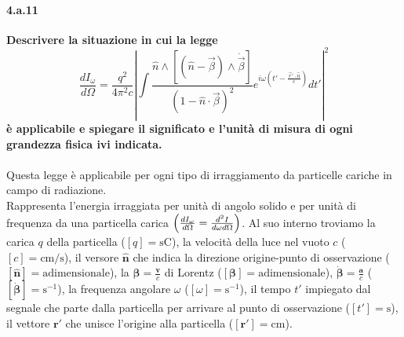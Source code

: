 \documentclass[twoside]{article}
\begin{document}
\paragraph{4.a.11}\textbf{Descrivere la situazione in cui la legge 
\begin{equation}
    \frac{dI_{\omega}}{d\Omega}=\frac{q^2}{4\pi^2c}\left| \int \frac{\hat{n}\wedge \left[(\hat{n}-\vec{\beta})\wedge \dot{\vec{\beta}} \right]}{(1-\hat{n}\cdot \vec{\beta})^2} e^{i\omega \left( t'-\frac{\vec{r}'\cdot \hat{n}}{c} \right)}dt'\right|^2
\end{equation}
è
applicabile e spiegare il significato e l'unità di misura di ogni grandezza fisica ivi
indicata.}\\ \\

Questa legge è applicabile per ogni tipo di irraggiamento da particelle cariche in campo di radiazione.
\\

Rappresenta l'energia irraggiata per unità di angolo solido e per unità di frequenza da una particella carica $\Bigl( \frac{dI_\omega}{d\Omega}=\frac{d^2I}{d\omega d\Omega} \Bigr)$. Al suo interno troviamo la carica $q$ della particella ($[q]=\text{sC}$), la velocità della luce nel vuoto $c$ ($[c]=\text{cm/s}$), il versore $\mathbf{\hat{n}}$ che indica la direzione origine-punto di osservazione ($[\mathbf{\hat{n}}]=\text{adimensionale}$), la $\bm{\beta}=\frac{\mathbf{v}}{c}$ di Lorentz ($[\bm{\beta}]=\text{adimensionale}$), $\bm{\dot{\beta}}=\frac{\mathbf{a}}{c}$ ($[\bm{\dot{\beta}}]=\text{s}^{-1}$), la frequenza angolare $\omega$ ($[\omega]=\text{s}^{-1}$), il tempo $t'$ impiegato dal segnale che parte dalla particella per arrivare al punto di osservazione ($[t']=\text{s}$), il vettore $\mathbf{r'}$ che unisce l'origine alla particella ($[\mathbf{r'}]=\text{cm}$).
\end{document}
